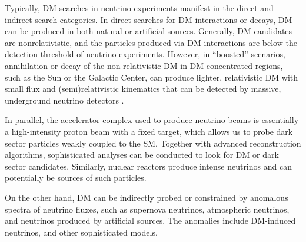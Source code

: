\documentclass[nofootinbib]{article}
\begin{document}
Typically, DM searches in neutrino experiments manifest in the direct and indirect search categories.  
In direct searches for DM interactions or decays, DM can be produced in both natural or artificial sources.
Generally, DM candidates are nonrelativistic, and the particles produced via DM interactions are below the detection threshold of neutrino experiments.
However, in ``boosted'' scenarios, annihilation or decay of the non-relativistic DM in DM concentrated regions, such as the Sun or the Galactic Center, can produce lighter, relativistic DM with small flux and (semi)relativistic kinematics that can be detected by massive, underground neutrino detectors \cite{Berger:2022cab, Batell:2022xau}.

In parallel, the accelerator complex used to produce neutrino beams is essentially a high-intensity proton beam with a fixed target, which allows us to probe dark sector particles weakly coupled to the SM.
Together with advanced reconstruction algorithms, sophisticated analyses can be conducted to look for DM or dark sector candidates.
Similarly, nuclear reactors produce intense neutrinos and can potentially be sources of such particles.

On the other hand, DM can be indirectly probed or constrained by anomalous spectra of neutrino fluxes,
such as supernova neutrinos, atmospheric neutrinos, and neutrinos produced by artificial sources.
The anomalies include DM-induced neutrinos, and other sophisticated models.
\vspace{1em}
 


\end{document}

